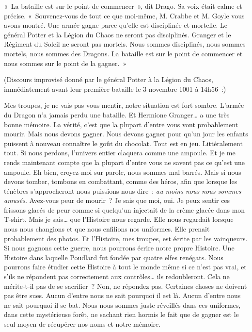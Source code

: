 «~La bataille est sur le point de commencer~», dit Drago.
Sa voix était calme et précise.
«~Souvenez-vous de tout ce que moi-même, M. Crabbe et M. Goyle vous avons montré.
Une armée gagne parce qu'elle est disciplinée et mortelle.
Le général Potter et la Légion du Chaos ne seront pas disciplinés.
Granger et le Régiment du Soleil ne seront pas mortels.
Nous sommes disciplinés, nous sommes mortels, nous sommes des Dragons.
La bataille est sur le point de commencer et nous sommes sur le point de la gagner.~»

\later

(Discours improvisé donné par le général Potter à la Légion du Chaos, immédiatement avant leur première bataille le 3 novembre 1001 à 14h56~:)

Mes troupes, je ne vais pas vous mentir, notre situation est fort sombre.
L'armée du Dragon n'a jamais perdu une bataille.
Et Hermione Granger… a une très bonne mémoire.
La vérité, c'est que la plupart d'entre vous vont probablement mourir.
Mais nous devons gagner.
Nous devons gagner pour qu'un jour les enfants puissent à nouveau connaître le goût du chocolat.
Tout est en jeu.
Littéralement tout.
Si nous perdons, l'univers entier claquera comme une ampoule.
Et je me rends maintenant compte que la plupart d'entre vous ne savent pas ce qu'est une ampoule.
Eh bien, croyez-moi sur parole, nous sommes mal barrés.
Mais si nous devons tomber, tombons en combattant, comme des héros, afin que lorsque les ténèbres s'approcheront nous puissions nous dire~: \emph{au moins nous nous sommes amusés}.
Avez-vous peur de mourir~?
Je sais que moi, oui.
Je peux sentir ces frissons glacés de peur comme si quelqu'un injectait de la crème glacée dans mon T-shirt.
Mais je sais… que l'Histoire nous regarde.
Elle nous regardait lorsque nous nous changions et que nous enfilions nos uniformes.
Elle prenait probablement des photos.
Et l'Histoire, mes troupes, est écrite par les vainqueurs.
Si nous gagnons cette guerre, nous pourrons écrire notre propre Histoire.
Une Histoire dans laquelle Poudlard fut fondée par quatre elfes renégats.
Nous pourrons faire étudier cette Histoire à tout le monde même si ce n'est pas vrai, et s'ils ne répondent pas correctement aux contrôles… ils redoubleront.
Cela ne mérite-t-il pas de se sacrifier~?
Non, ne répondez pas.
Certaines choses ne doivent pas être sues.
Aucun d'entre nous ne sait pourquoi il est là.
Aucun d'entre nous ne sait pourquoi il se bat.
Nous nous sommes juste réveillés dans ces uniformes, dans cette mystérieuse forêt, ne sachant rien hormis le fait que de gagner est le seul moyen de récupérer nos noms et notre mémoire.

